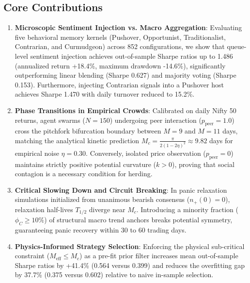 \subsection{Core Contributions}
\begin{enumerate}
    \item \textbf{Microscopic Sentiment Injection vs. Macro Aggregation}: Evaluating five behavioral memory kernels (Pushover, Opportunist, Traditionalist, Contrarian, and Curmudgeon) across 852 configurations, we show that queue-level sentiment injection achieves out-of-sample Sharpe ratios up to 1.486 (annualized return +18.4\%, maximum drawdown -14.6\%), significantly outperforming linear blending (Sharpe 0.627) and majority voting (Sharpe 0.153). Furthermore, injecting Contrarian signals into a Pushover host achieves Sharpe 1.470 with daily turnover reduced to 15.2\%.
    \item \textbf{Phase Transitions in Empirical Crowds}: Calibrated on daily Nifty 50 returns, agent swarms ($N=150$) undergoing peer interaction ($p_{\text{peer}}=1.0$) cross the pitchfork bifurcation boundary between $M=9$ and $M=11$ days, matching the analytical kinetic prediction $M_c = \frac{\pi}{2(1-2\eta)^2} \approx 9.82$ days for empirical noise $\eta = 0.30$. Conversely, isolated price observation ($p_{\text{peer}}=0$) maintains strictly positive potential curvature ($k > 0$), proving that social contagion is a necessary condition for herding.
    \item \textbf{Critical Slowing Down and Circuit Breaking}: In panic relaxation simulations initialized from unanimous bearish consensus ($n_+(0)=0$), relaxation half-lives $T_{1/2}$ diverge near $M_c$. Introducing a minority fraction ($\phi_C \ge 10\%$) of structural macro trend anchors breaks potential symmetry, guaranteeing panic recovery within 30 to 60 trading days.
    \item \textbf{Physics-Informed Strategy Selection}: Enforcing the physical sub-critical constraint ($M_{\text{eff}} \le M_c$) as a pre-fit prior filter increases mean out-of-sample Sharpe ratios by +41.4\% (0.564 versus 0.399) and reduces the overfitting gap by 37.7\% (0.375 versus 0.602) relative to naive in-sample selection.
\end{enumerate}
